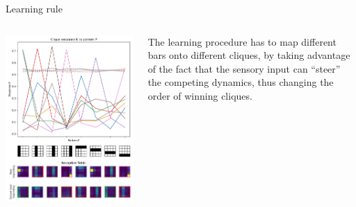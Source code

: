 \documentclass[final,hyperref={pdfpagelabels=false}]{beamer}
\begin{document}
\begin{frame}
\begin{columns}
\begin{column}{.64\textwidth}
\begin{minipage}[T]{.95\textwidth}
{					\begin{block}{Learning rule}
						\begin{columns}
							\begin{column}[T]{.5\textwidth}
								\includegraphics[width=1\linewidth]{complete2.pdf}	
							\end{column}								
							
							\begin{column}[T]{.5\textwidth}
								The learning procedure has to map different bars onto different cliques, by taking advantage of the fact that the sensory input can ``steer'' the competing dynamics, thus changing the order of winning cliques.
								

\end{column}
\end{columns}
\end{block}}
\end{minipage}
\end{column}
\end{columns}
\end{frame}
\end{document}
